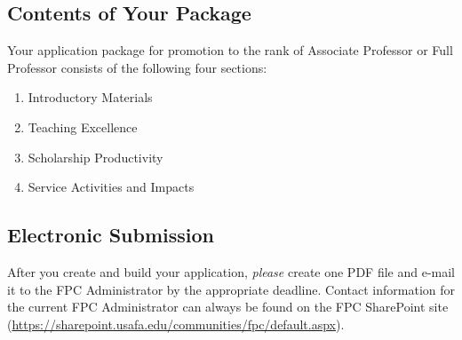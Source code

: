 \documentclass[11pt,titlepage]{article}
\begin{document}
\subsection*{Contents of Your Package}
Your application package for promotion to the rank of Associate Professor or Full Professor consists of the following four sections:
\begin{enumerate}
  \item Introductory Materials
  \item Teaching Excellence
  \item Scholarship Productivity
  \item Service Activities and Impacts
\end{enumerate}

\subsection*{Electronic Submission}
After you create and build your application, \emph{please} create one PDF file and e-mail it to the \gls{FPC} Administrator by the appropriate deadline.
Contact information for the current \gls{FPC} Administrator can always be found on the \gls{FPC} SharePoint site (\url{https://sharepoint.usafa.edu/communities/fpc/default.aspx}).

\end{document}
